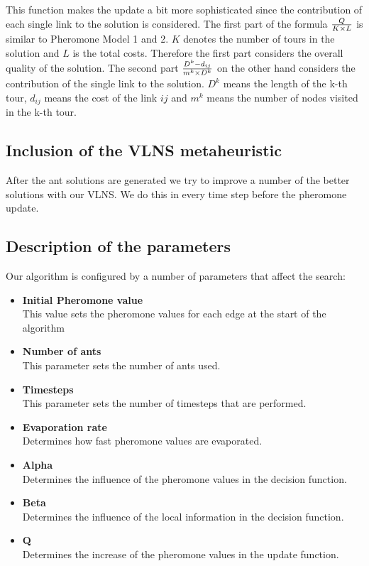 \documentclass[a4paper]{scrartcl}
\begin{document}
This function makes the update a bit more sophisticated since the contribution of each single link to the solution is considered. The first part of the formula ${Q \over {K \times L}}$ is similar to Pheromone Model 1 and 2. $K$ denotes the number of tours in the solution and $L$ is the total costs. Therefore the first part considers the overall quality of the solution. The second part ${{D^k - d_{ij}} \over {m^k \times D^k}}$ on the other hand considers the contribution of the single link to the solution. $D^k$ means the length of the k-th tour, $d_{ij}$ means the cost of the link $ij$ and $m^k$ means the number of nodes visited in the k-th tour.


\subsection{Inclusion of the VLNS metaheuristic}

After the ant solutions are generated we try to improve a number of the better solutions with our VLNS. We do this in every time step before the pheromone update.


\subsection{Description of the parameters}
Our algorithm is configured by a number of parameters that affect the search:

\begin{itemize}
  \item \textbf{Initial Pheromone value} \\
    This value sets the pheromone values for each edge at the start of the algorithm
  \item \textbf{Number of ants} \\
    This parameter sets the number of ants used.
  \item \textbf{Timesteps} \\
    This parameter sets the number of timesteps that are performed.
  \item \textbf{Evaporation rate} \\
    Determines how fast pheromone values are evaporated.
  \item \textbf{Alpha} \\
    Determines the influence of the pheromone values in the decision function.
  \item \textbf{Beta} \\
    Determines the influence of the local information in the decision function.
  \item \textbf{Q} \\
    Determines the increase of the pheromone values in the update function.
\end{itemize}
\end{document}
